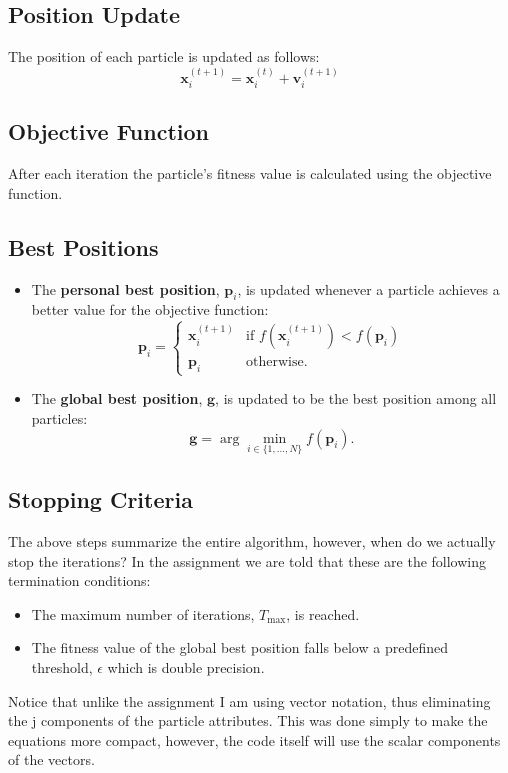 \documentclass[12pt]{article}
\begin{document}
\subsection*{Position Update}
The position of each particle is updated as follows:
\[
\mathbf{x}_i^{(t+1)} = \mathbf{x}_i^{(t)} + \mathbf{v}_i^{(t+1)}
\]

\subsection*{Objective Function}
After each iteration the particle's fitness value is calculated using the objective function. 

\subsection*{Best Positions}
\begin{itemize}
    \item The \textbf{personal best position}, $\mathbf{p}_i$, is updated whenever a particle achieves a better value for the objective function:
    \[
    \mathbf{p}_i = 
    \begin{cases} 
    \mathbf{x}_i^{(t+1)} & \text{if } f(\mathbf{x}_i^{(t+1)}) < f(\mathbf{p}_i) \\
    \mathbf{p}_i & \text{otherwise.}
    \end{cases}
    \]
    \item The \textbf{global best position}, $\mathbf{g}$, is updated to be the best position among all particles:
    \[
    \mathbf{g} = \arg\min_{i \in \{1, \dots, N\}} f(\mathbf{p}_i).
    \]
\end{itemize}

\subsection*{Stopping Criteria}
The above steps summarize the entire algorithm, however, when do we actually stop the iterations? In the assignment we are told that these are the following termination conditions: 
\begin{itemize}
    \item The maximum number of iterations, $T_{\text{max}}$, is reached.
    \item The fitness value of the global best position falls below a predefined threshold, $\epsilon$ which is double precision.
\end{itemize}
Notice that unlike the assignment I am using vector notation, thus eliminating the j components of the particle attributes. This was done simply to make the equations more compact, however, the code itself will use the scalar components of the vectors. 
	
\end{document}
